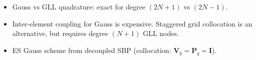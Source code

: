 \documentclass[compress]{beamer}
\theoremstyle{plain}
\begin{document}
{\begin{figure}
\end{figure}
\begin{itemize}
\item Gauss vs GLL quadrature: exact for degree $(2N+1)$ vs $(2N-1)$.  
\vspace{.25em}
\item Inter-element coupling for Gauss is expensive.  Staggered grid collocation is an alternative, but requires degree $(N+1)$ GLL nodes.  
\vspace{.25em}
\item ES Gauss scheme from decoupled SBP (collocation: $\bm{V}_q = \bm{P}_q = \bm{I}$).
\end{itemize}

\let\thefootnote\relax{}
}
\end{document}
